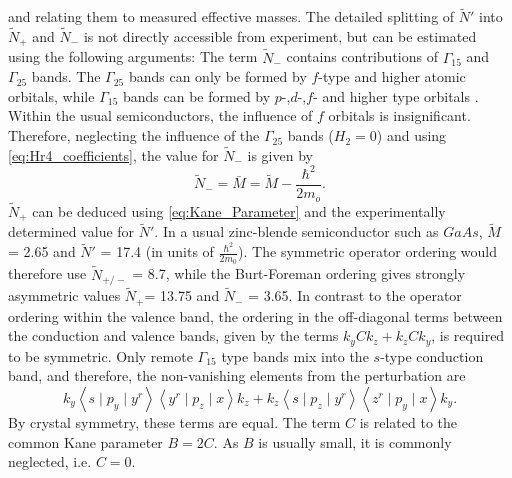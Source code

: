 and relating them to measured effective masses. The detailed splitting
of $\tilde{N}'$ into $\tilde{N}_{+}$ and $\tilde{N}_{-}$ is not
directly accessible from experiment, but can be estimated \citet{Foreman1993}
using the following arguments: The term $\tilde{N}_{-}$ contains
contributions of $\Gamma_{15}$ and $\Gamma_{25}$ bands. The $\Gamma_{25}$
bands can only be formed by $f$-type and higher atomic orbitals,
while $\Gamma_{15}$ bands can be formed by $p$-,$d$-,$f$- and
higher type orbitals \citet{Foreman1995b}. Within the usual semiconductors,
the influence of $f$ orbitals is insignificant. Therefore, neglecting
the influence of the $\Gamma_{25}$ bands ($H_{2}=0$) and using \ref{eq:Hr4_coefficients},
the value for $\tilde{N}_{-}$ is given by \begin{equation}
\tilde{N}_{-}=\bar{M}=\tilde{M}-\frac{\hbar^{2}}{2m_{o}}.\end{equation}
$\tilde{N}_{+}$ can be deduced using \ref{eq:Kane_Parameter} and
the experimentally determined value for $\tilde{N}'$. In a usual
zinc-blende semiconductor such as $GaAs$, $\tilde{M}$ = \textminus{}2.65
and $\tilde{N}'$ = \textminus{}17.4 (in units of $\frac{\hbar^{2}}{2m_{0}}$).
The symmetric operator ordering would therefore use $\tilde{N}_{+/-}$
= \textminus{}8.7, while the Burt-Foreman ordering gives strongly
asymmetric values $\tilde{N}_{+}$= \textminus{}13.75 and $\tilde{N}_{-}$
= \textminus{}3.65. In contrast to the operator ordering within the
valence band, the ordering in the off-diagonal terms between the conduction
and valence bands, given by the terms $k_{y}Ck_{z}+k_{z}Ck_{y}$,
is required to be symmetric. Only remote $\Gamma_{15}$ type bands
mix into the $s$-type conduction band, and therefore, the non-vanishing
elements from the perturbation are\begin{equation}
k_{y}\left\langle s\mid p_{y}\mid y^{r}\right\rangle \left\langle y^{r}\mid p_{z}\mid x\right\rangle k_{z}+k_{z}\left\langle s\mid p_{z}\mid y^{r}\right\rangle \left\langle z^{r}\mid p_{y}\mid x\right\rangle k_{y}.\end{equation}
By crystal symmetry, these terms are equal. The term $C$ is related
to the common Kane parameter $B=2C$. As $B$ is usually small, it
is commonly neglected, i.e. $C=0$.

\newpage{}

